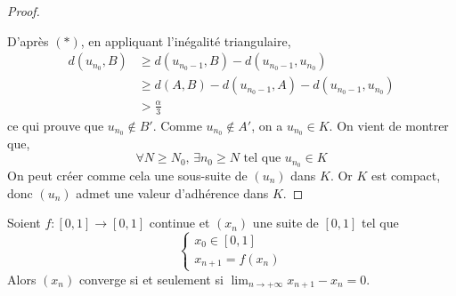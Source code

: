 \begin{proof}
\begin{center}
		\end{center}
		D'après $(*)$, en appliquant l'inégalité triangulaire,
		\begin{align*}
			d(u_{n_0}, B) & \geq d(u_{n_0 - 1}, B) - d(u_{n_0 - 1}, u_{n_0})           \\
			& \geq d(A, B) - d(u_{n_0 - 1}, A) - d(u_{n_0 - 1}, u_{n_0}) \\
			& > \frac{\alpha}{3}
		\end{align*}
		ce qui prouve que $u_{n_0} \notin B'$. Comme $u_{n_0} \notin A'$, on a $u_{n_0} \in K$. On vient de montrer que,
		\[ \forall N \geq N_0, \, \exists n_0 \geq N \text{ tel que } u_{n_0} \in K \]
		On peut créer comme cela une sous-suite de $(u_n)$ dans $K$. Or $K$ est compact, donc $(u_n)$ admet une valeur d'adhérence dans $K$.
	\end{proof}

	\begin{application}
		Soient $f : [0, 1] \rightarrow [0, 1]$ continue et $(x_n)$ une suite de $[0, 1]$ tel que
		\[ \begin{cases} x_0 \in [0, 1] \\ x_{n+1} = f(x_n) \end{cases} \]
		Alors $(x_n)$ converge si et seulement si $\lim_{n \rightarrow +\infty } x_{n+1} - x_n = 0$.
	\end{application}

